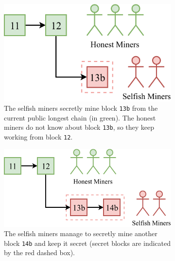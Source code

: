 \begin{figure}[h]
	\begin{subfigure}{\textwidth}
		\centering
		\vspace*{0.25cm}
		\includegraphics[scale=0.9]{figures/selfish_1}
		\vspace*{0.25cm}
		\caption{
			The selfish miners secretly mine block \texttt{13b} from the current public longest chain (in green).
			The honest miners do not know about block \texttt{13b}, so they keep working from block \texttt{12}.
		}
		\vspace*{0.75cm}
	\end{subfigure}
	\begin{subfigure}{\textwidth}
		\centering
		\vspace*{0.25cm}
		\includegraphics[scale=0.9]{figures/selfish_2}
		\vspace*{0.25cm}
		\caption{The selfish miners manage to secretly mine another block \texttt{14b} and keep it secret (secret blocks are indicated by the red dashed box).}
		\vspace*{0.75cm}
	\end{subfigure}
	\begin{subfigure}{\textwidth}
		\centering
		\vspace*{0.25cm}

\end{subfigure}
\end{figure}
